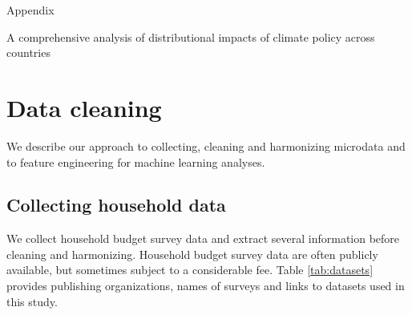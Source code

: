 \documentclass[12pt, a4paper]{article}
\begin{document}
\appendix 
\begin{refsection}
{\Huge Appendix} \label{sec:appendix}

A comprehensive analysis of distributional impacts of climate policy across countries

\clearpage
\section{Data cleaning} \label{sec:cleaning}

We describe our approach to collecting, cleaning and harmonizing microdata and to feature engineering for machine learning analyses.

\subsection{Collecting household data}\label{sec:cleaning_1}

We collect household budget survey data and extract several information before cleaning and harmonizing. Household budget survey data are often publicly available, but sometimes subject to a considerable fee. Table \ref{tab:datasets} provides publishing organizations, names of surveys and links to datasets used in this study.


\end{refsection}
\end{document}
